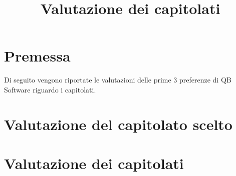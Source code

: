 \documentclass[12pt]{article}
\title{Valutazione dei capitolati}
\begin{document}
	\makefirstpage
	
	
	\clearpage
	
	\tableofcontents
	\clearpage
	
	\section{Premessa}
	Di seguito vengono riportate le valutazioni delle prime 3 preferenze di QB Software riguardo i capitolati.
	\section{Valutazione del capitolato scelto}
	
	\section{Valutazione dei capitolati}
	
	
\end{document}
